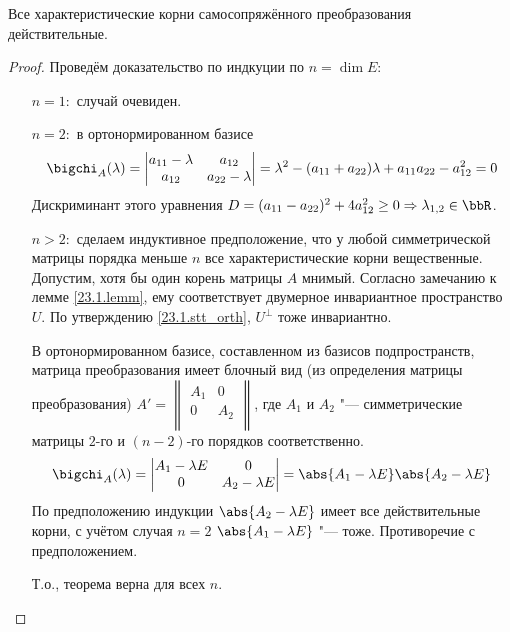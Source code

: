   \begin{thm}\label{23.1.thm1}
  Все характеристические корни самосопряжённого преобразования действительные.
  \end{thm}
  \begin{proof} Проведём доказательство по индкуции по $n=\dim E$:
  \linebreak\vspace*{-\baselineskip}
  \begin{itemize}
  \item[\underline{$n=1:$}] случай очевиден.
  \item[\underline{$n=2:$}] в ортонормированном базисе
    \begin{equation}
    \bigchi_A(\lambda)=\begin{vmatrix}
    a_{11}-\lambda & a_{12} \\
    a_{12} & a_{22}-\lambda
    \end{vmatrix}=\lambda^2-(a_{11}+a_{22})\lambda+a_{11}a_{22}-a_{12}^2=0 \end{equation}
    Дискриминант этого уравнения $D=(a_{11}-a_{22})^2+4a_{12}^2 \ge 0 \Rightarrow \lambda_{1,2} \in \bbR$.
  \item[\underline{$n>2:$}] сделаем индуктивное предположение, что у любой симметрической матрицы порядка меньше $n$ все характеристические корни вещественные. Допустим, хотя бы один корень матрицы $A$ мнимый. Согласно замечанию к лемме \ref{23.1.lemm}, ему соответствует двумерное инвариантное пространство $U$. По утверждению \ref{23.1.stt_orth}, $U^\perp$ тоже инвариантно.
  
  В ортонормированном базисе, составленном из базисов подпространств, матрица преобразования имеет блочный вид (из определения матрицы преобразования) $A'=\begin{Vmatrix}
  A_1 & 0 \\
  0 & A_2 \\
  \end{Vmatrix}$, где $A_1$ и $A_2$ "--- симметрические матрицы $2$-го и $(n-2)$-го порядков соответственно.
    \begin{equation}
    \bigchi_A(\lambda)=\begin{vmatrix}
    A_1-\lambda E & 0 \\
    0 & A_2-\lambda E
    \end{vmatrix}=\abs{A_1-\lambda E}\abs{A_2-\lambda E} \end{equation}
    По предположению индукции  $\abs{A_2-\lambda E}$ имеет все действительные корни, с учётом случая \underline{$n=2$} $\abs{A_1-\lambda E}$ "--- тоже. Противоречие с предположением. 
    
    Т.о., теорема верна для всех $n$.
  \end{itemize}
  \vspace{-1.65\baselineskip}  
  \end{proof}
  
